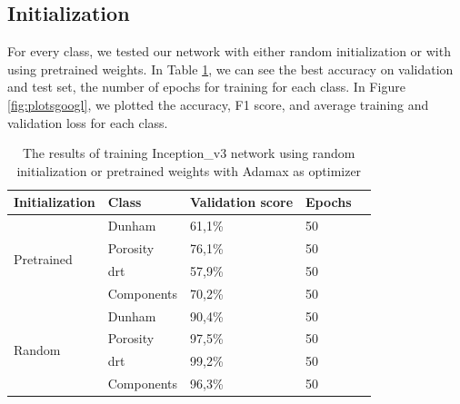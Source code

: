 \subsection{Initialization}
For every class, we tested our network with either random initialization or with using pretrained weights. In Table \ref{tab:googinit}, we can see the best accuracy on validation and test set, the number of epochs for training for each class.  
In Figure \ref{fig:plotsgoogl}, we plotted the accuracy, F1 score, and average training and validation loss for each class. 

\begin{table}
\caption[Results according to initialization of Inception\_v3]{\label{tab:googinit} The results of training Inception\_v3 network using random initialization or pretrained weights with Adamax as optimizer}
\centering
\begin{tabular}[b]{| l | l | l | l | l |}
\hline
    Initialization & Class & Validation score  & Epochs\\ \hline
    \multirow{4}{*}{Pretrained} & Dunham &  61,1\%  & 50 \\ %
    & Porosity & 76,1\% &  50 \\
    &\gls{drt} & 57,9\% &  50 \\
    &Components & 70,2\% &  50 \\ \hline
     \multirow{4}{*}{Random} & Dunham &  90,4\% & 50 \\
    & Porosity & 97,5\% &  50 \\
    &\gls{drt} & 99,2\% &  50 \\
    &Components & 96,3\% & 50 \\ \hline
\end{tabular} 
\end{table}

